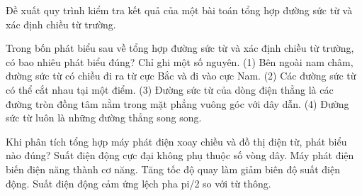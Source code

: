 \begin{bt}
Đề xuất quy trình kiểm tra kết quả của một bài toán tổng hợp đường sức từ và xác định chiều từ trường.
\end{bt}

\begin{ex}
Trong bốn phát biểu sau về tổng hợp đường sức từ và xác định chiều từ trường, có bao nhiêu phát biểu đúng? Chỉ ghi một số nguyên. (1) Bên ngoài nam châm, đường sức từ có chiều đi ra từ cực Bắc và đi vào cực Nam. (2) Các đường sức từ có thể cắt nhau tại một điểm. (3) Đường sức từ của dòng điện thẳng là các đường tròn đồng tâm nằm trong mặt phẳng vuông góc với dây dẫn. (4) Đường sức từ luôn là những đường thẳng song song.
\end{ex}

\begin{ex}
Khi phân tích tổng hợp máy phát điện xoay chiều và đồ thị điện từ, phát biểu nào đúng?
\choice
{Suất điện động cực đại không phụ thuộc số vòng dây.}
{Máy phát điện biến điện năng thành cơ năng.}
{Tăng tốc độ quay làm giảm biên độ suất điện động.}
{\True Suất điện động cảm ứng lệch pha pi/2 so với từ thông.}
\end{ex}

